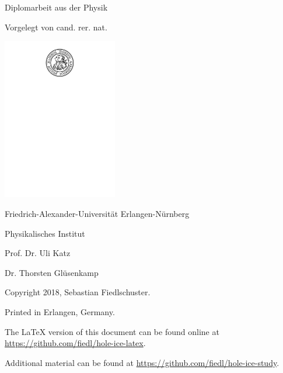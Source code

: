 

%
%
%

\makeatletter
\begin{titlepage}
  \begin{center}
  \begin{otherlanguage}{ngerman}

    \LARGE \@title

    \vspace{1cm}

    \large

    Diplomarbeit aus der Physik \medskip

    Vorgelegt von cand. rer. nat. \\ \@author \medskip

    \@date

    \vspace{1cm}
    \includegraphics[width=5cm, decodearray={0.2 0.5}]{img/fau-siegel-schwarz}
    \vspace{1cm}

    Friedrich-Alexander-Universität Erlangen-Nürnberg \medskip

    Physikalisches Institut \medskip

    Prof. Dr. Uli Katz \medskip

    Dr. Thorsten Glüsenkamp



  \end{otherlanguage}
  \end{center}
\end{titlepage}
\makeatother


\newpage
\thispagestyle{empty}
\mbox{}\vfill
Copyright 2018, Sebastian Fiedlschuster.

Printed in Erlangen, Germany.

The \LaTeX\xspace version of this document can be found online at \url{https://github.com/fiedl/hole-ice-latex}.

Additional material can be found at \url{https://github.com/fiedl/hole-ice-study}.

